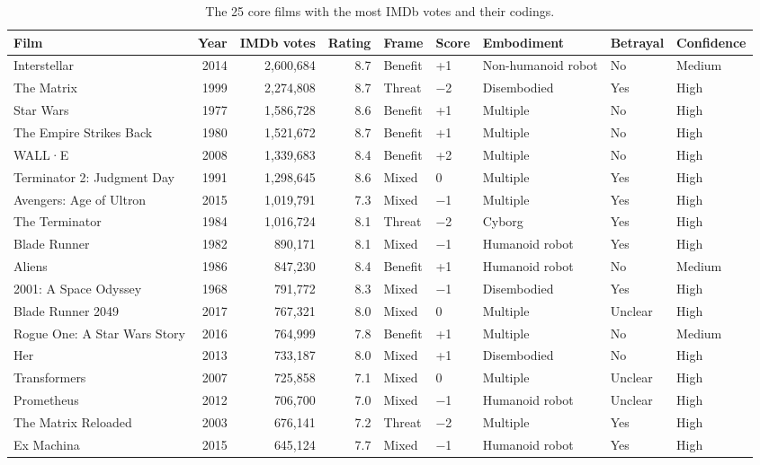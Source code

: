 \begin{table}[htbp]
\centering
\caption{The 25 core films with the most IMDb votes and their codings.}
\label{tab:most_voted_films}
\begin{tabular}{lrrrlllll}
\toprule
Film & Year & IMDb votes & Rating & Frame & Score & Embodiment & Betrayal & Confidence \\
\midrule
Interstellar & 2014 & 2,600,684 & 8.7 & Benefit & +1 & Non-humanoid robot & No & Medium \\
The Matrix & 1999 & 2,274,808 & 8.7 & Threat & −2 & Disembodied & Yes & High \\
Star Wars & 1977 & 1,586,728 & 8.6 & Benefit & +1 & Multiple & No & High \\
The Empire Strikes Back & 1980 & 1,521,672 & 8.7 & Benefit & +1 & Multiple & No & High \\
WALL·E & 2008 & 1,339,683 & 8.4 & Benefit & +2 & Multiple & No & High \\
Terminator 2: Judgment Day & 1991 & 1,298,645 & 8.6 & Mixed & 0 & Multiple & Yes & High \\
Avengers: Age of Ultron & 2015 & 1,019,791 & 7.3 & Mixed & −1 & Multiple & Yes & High \\
The Terminator & 1984 & 1,016,724 & 8.1 & Threat & −2 & Cyborg & Yes & High \\
Blade Runner & 1982 & 890,171 & 8.1 & Mixed & −1 & Humanoid robot & Yes & High \\
Aliens & 1986 & 847,230 & 8.4 & Benefit & +1 & Humanoid robot & No & Medium \\
2001: A Space Odyssey & 1968 & 791,772 & 8.3 & Mixed & −1 & Disembodied & Yes & High \\
Blade Runner 2049 & 2017 & 767,321 & 8.0 & Mixed & 0 & Multiple & Unclear & High \\
Rogue One: A Star Wars Story & 2016 & 764,999 & 7.8 & Benefit & +1 & Multiple & No & Medium \\
Her & 2013 & 733,187 & 8.0 & Mixed & +1 & Disembodied & No & High \\
Transformers & 2007 & 725,858 & 7.1 & Mixed & 0 & Multiple & Unclear & High \\
Prometheus & 2012 & 706,700 & 7.0 & Mixed & −1 & Humanoid robot & Unclear & High \\
The Matrix Reloaded & 2003 & 676,141 & 7.2 & Threat & −2 & Multiple & Yes & High \\
Ex Machina & 2015 & 645,124 & 7.7 & Mixed & −1 & Humanoid robot & Yes & High \\

\end{tabular}
\end{table}

